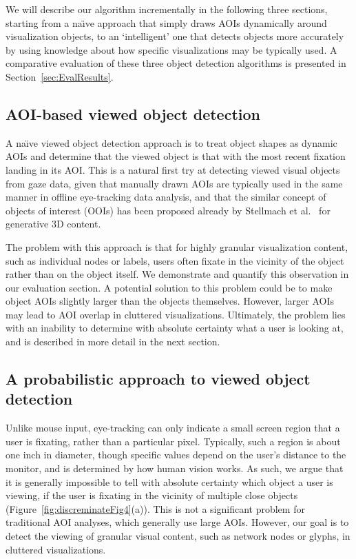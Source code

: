 We will describe our algorithm incrementally in the following three sections, starting from a na\"{\i}ve approach that simply draws AOIs dynamically around visualization objects, to an `intelligent' one that detects objects more accurately by using knowledge about how specific visualizations may be typically used.  A comparative evaluation of these three object detection algorithms is presented in Section~\ref{sec:EvalResults}.

\subsection{AOI-based viewed object detection}
\label{sec:AOIBasedViewedObjectDetection}
A na\"{\i}ve viewed object detection approach is to treat object shapes as dynamic AOIs and determine that the viewed object is that with the most recent fixation landing in its AOI. This is a natural first try at detecting viewed visual objects from gaze data, given that manually drawn AOIs are typically used in the same manner in offline eye-tracking data analysis, and that the similar concept of objects of interest (OOIs) has been proposed already by Stellmach et al.~\cite{stellmach20103d} for generative 3D content.

The problem with this approach is that for highly granular visualization content, such as individual nodes or labels, users often fixate in the vicinity of the object rather than on the object itself. We demonstrate and quantify this observation in our evaluation section. A potential solution to this problem could be to make object AOIs slightly larger than the objects themselves. However, larger AOIs may lead to AOI overlap in cluttered visualizations. Ultimately, the problem lies with an inability to determine with absolute certainty what a user is looking at, and is described in more detail in the next section.

\subsection{A probabilistic approach to viewed object detection}
\label{sec:ProbabilisticObjectDetection}
Unlike mouse input, eye-tracking can only indicate a small screen region that a user is fixating, rather than a particular pixel. Typically, such a region is about one inch in diameter, though specific values depend on the user's distance to the monitor, and is determined by how human vision works. As such, we argue that it is generally impossible to tell with absolute certainty which object a user is viewing, if the user is fixating in the vicinity of multiple close objects (Figure~\ref{fig:discreminateFig4}(a)). This is not a significant problem for traditional AOI analyses, which generally use large AOIs. However, our goal is to detect the viewing of granular visual content, such as network nodes or glyphs, in cluttered visualizations. 

